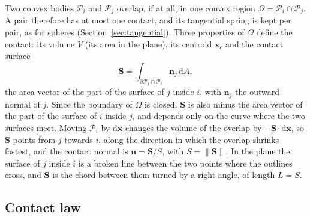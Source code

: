 Two convex bodies $\mathcal{P}_{i}$ and $\mathcal{P}_{j}$ overlap, if at all, in one convex region $\Omega=\mathcal{P}_{i}\cap\mathcal{P}_{j}$.
A pair therefore has at most one contact, and its tangential spring is kept per pair, as for spheres (Section~\ref{sec:tangential}).
Three properties of $\Omega$ define the contact: its volume $V$ (its area in the plane), its centroid $\mathbf{x}_{c}$ and the contact surface
\begin{equation}
  \mathbf{S} = \int_{\partial\mathcal{P}_{j}\cap\mathcal{P}_{i}} \mathbf{n}_{j}\,\mathrm{d}A ,
  \label{eq:contact-surface}
\end{equation}
the area vector of the part of the surface of $j$ inside $i$, with $\mathbf{n}_{j}$ the outward normal of $j$.
Since the boundary of $\Omega$ is closed, $\mathbf{S}$ is also minus the area vector of the part of the surface of $i$ inside $j$, and depends only on the curve where the two surfaces meet.
Moving $\mathcal{P}_{i}$ by $\mathrm{d}\mathbf{x}$ changes the volume of the overlap by $-\mathbf{S}\cdot\mathrm{d}\mathbf{x}$, so $\mathbf{S}$ points from $j$ towards $i$, along the direction in which the overlap shrinks fastest, and the contact normal is $\mathbf{n}=\mathbf{S}/S$, with $S=\lVert\mathbf{S}\rVert$.
In the plane the surface of $j$ inside $i$ is a broken line between the two points where the outlines cross, and $\mathbf{S}$ is the chord between them turned by a right angle, of length $L=S$.

\subsection{Contact law}

